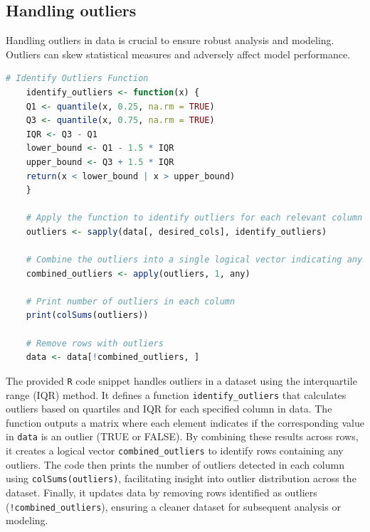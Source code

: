 \newpage
\subsection{Handling outliers}
Handling outliers in data is crucial to ensure robust analysis and modeling. Outliers can skew statistical measures and adversely affect model performance.

\begin{lstlisting}[language=R]
    # Identify Outliers Function
    identify_outliers <- function(x) {
    Q1 <- quantile(x, 0.25, na.rm = TRUE)
    Q3 <- quantile(x, 0.75, na.rm = TRUE)
    IQR <- Q3 - Q1
    lower_bound <- Q1 - 1.5 * IQR
    upper_bound <- Q3 + 1.5 * IQR
    return(x < lower_bound | x > upper_bound)
    }

    # Apply the function to identify outliers for each relevant column
    outliers <- sapply(data[, desired_cols], identify_outliers)

    # Combine the outliers into a single logical vector indicating any row with an outlier
    combined_outliers <- apply(outliers, 1, any)

    # Print number of outliers in each column
    print(colSums(outliers))

    # Remove rows with outliers
    data <- data[!combined_outliers, ]
\end{lstlisting}

The provided \texttt{R} code snippet handles outliers in a dataset using the interquartile range (IQR) method. It defines a function \texttt{identify\_outliers} that calculates outliers based on quartiles and IQR for each specified column in data. The function outputs a matrix where each element indicates if the corresponding value in \texttt{data} is an outlier (TRUE or FALSE). By combining these results across rows, it creates a logical vector \texttt{combined\_outliers} to identify rows containing any outliers. The code then prints the number of outliers detected in each column using \texttt{colSums(outliers)}, facilitating insight into outlier distribution across the dataset. Finally, it updates data by removing rows identified as outliers (\texttt{!combined\_outliers}), ensuring a cleaner dataset for subsequent analysis or modeling.


\newpage